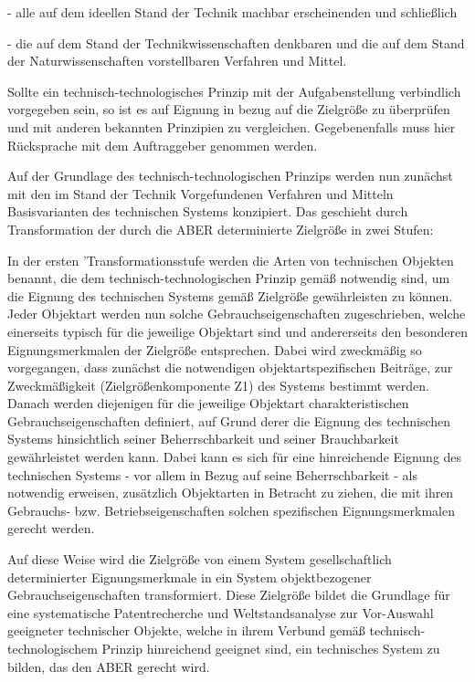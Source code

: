 \documentclass[12pt,a4paper]{article}
\begin{document}
- alle auf dem ideellen Stand der Technik machbar erscheinenden und schließlich

- die auf dem Stand der Technikwissenschaften denkbaren und die auf dem Stand der Naturwissenschaften vorstellbaren Verfahren und Mittel.

Sollte ein technisch-technologisches Prinzip mit der Aufgabenstellung verbindlich vorgegeben sein, so ist es auf Eignung in bezug auf die Zielgröße zu überprüfen und mit anderen bekannten Prinzipien zu vergleichen. Gegebenenfalls muss hier Rücksprache mit dem Auftraggeber genommen werden.

Auf der Grundlage des technisch-technologischen Prinzips werden nun zunächst mit den im Stand der Technik Vorgefundenen Verfahren und Mitteln Basisvarianten des technischen Systems konzipiert. Das geschieht durch Transformation der durch die ABER determinierte Zielgröße in zwei Stufen:

In der ersten 'Transformationsstufe werden die Arten von technischen Objekten benannt, die dem technisch-technologischen Prinzip gemäß notwendig sind, um die Eignung des technischen Systems gemäß Zielgröße gewährleisten zu können. Jeder Objektart werden nun solche Gebrauchseigenschaften zugeschrieben, welche einerseits typisch für die jeweilige Objektart sind und andererseits den besonderen Eignungsmerkmalen der Zielgröße entsprechen. Dabei wird zweckmäßig so vorgegangen, dass zunächst die notwendigen objektartspezifischen Beiträge, zur Zweckmäßigkeit (Zielgrößenkomponente Z1) des Systems bestimmt werden. Danach werden diejenigen für die jeweilige Objektart charakteristischen Gebrauchseigenschaften definiert, auf Grund derer die Eignung des technischen Systems hinsichtlich seiner Beherrschbarkeit und seiner Brauchbarkeit gewährleistet werden kann. Dabei kann es sich für eine hinreichende Eig­nung des technischen Systems - vor allem in Bezug auf seine Beherrschbarkeit - als notwendig erweisen, zusätzlich Objektarten in Betracht zu ziehen, die mit ihren Gebrauchs- bzw. Betriebseigenschaften solchen spezifischen Eignungsmerkmalen gerecht werden.

Auf diese Weise wird die Zielgröße von einem System gesellschaftlich determinierter Eignungsmerkmale in ein System objektbezogener Gebrauchseigenschaften transformiert. Diese Zielgröße bildet die Grundlage für eine systematische Patentrecherche und Weltstandsanalyse zur Vor-Auswahl geeigneter technischer Objekte, welche in ihrem Verbund gemäß technisch-technologischem Prinzip hinreichend geeignet sind, ein technisches System zu bilden, das den ABER gerecht wird.
\end{document}
